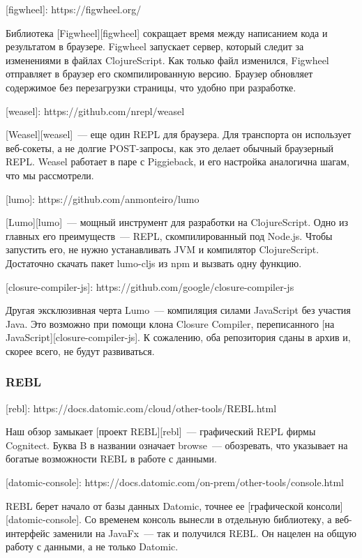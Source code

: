 [figwheel]: https://figwheel.org/

Библиотека [Figwheel][figwheel] сокращает время между написанием кода и результатом в браузере. Figwheel запускает сервер, который следит за изменениями в файлах ClojureScript. Как только файл изменился, Figwheel отправляет в браузер его скомпилированную версию. Браузер обновляет содержимое без перезагрузки страницы, что удобно при разработке.

[weasel]: https://github.com/nrepl/weasel

[Weasel][weasel]~--- еще один REPL для браузера. Для транспорта он использует веб-сокеты, а не долгие POST-запросы, как это делает обычный браузерный REPL. Weasel работает в паре с Piggieback, и его настройка аналогична шагам, что мы рассмотрели.

[lumo]: https://github.com/anmonteiro/lumo

[Lumo][lumo]~--- мощный инструмент для разработки на ClojureScript. Одно из главных его преимуществ~--- REPL, скомпилированный под Node.js. Чтобы запустить его, не нужно устанавливать JVM и компилятор ClojureScript. Достаточно скачать пакет lumo-cljs из npm и вызвать одну функцию.

[closure-compiler-js]: https://github.com/google/closure-compiler-js

Другая эксклюзивная черта Lumo~--- компиляция силами JavaScript без участия Java. Это возможно при помощи клона Closure Compiler, переписанного [на JavaScript][closure-compiler-js]. К сожалению, оба репозитория сданы в архив и, скорее всего, не будут развиваться.

\subsubsection{REBL}

[rebl]: https://docs.datomic.com/cloud/other-tools/REBL.html

Наш обзор замыкает [проект REBL][rebl]~--- графический REPL фирмы Cognitect. Буква B в названии означает browse~--- обозревать, что указывает на богатые возможности REBL в работе с данными.

[datomic-console]: https://docs.datomic.com/on-prem/other-tools/console.html

REBL берет начало от базы данных Datomic, точнее ее [графической консоли][datomic-console]. Со временем консоль вынесли в отдельную библиотеку, а веб-интерфейс заменили на JavaFx~--- так и получился REBL. Он нацелен на общую работу с данными, а не только Datomic.

